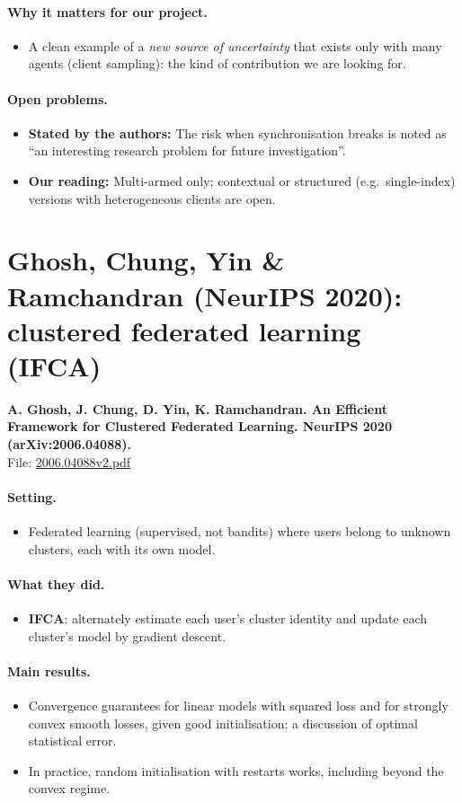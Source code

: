 \documentclass[11pt]{article}
\newcommand{\stated}{\textcolor{green!40!black}{\textbf{Stated by the authors:}}}
\newcommand{\ours}{\textcolor{orange!80!black}{\textbf{Our reading:}}}
\newcommand{\file}[1]{\url{#1}}
\begin{document}
\paragraph{Why it matters for our project.}
\begin{itemize}\item A clean example of a \emph{new source of uncertainty} that exists only with many agents (client sampling): the kind of contribution we are looking for.\end{itemize}
\paragraph{Open problems.}
\begin{itemize}\item \stated{} The risk when synchronisation breaks is noted as ``an interesting research problem for future investigation''.\item \ours{} Multi-armed only; contextual or structured (e.g.\ single-index) versions with heterogeneous clients are open.\end{itemize}
\section{Ghosh, Chung, Yin \& Ramchandran (NeurIPS 2020): clustered federated learning (IFCA)}
\textbf{A. Ghosh, J. Chung, D. Yin, K. Ramchandran. An Efficient Framework for Clustered Federated Learning. NeurIPS 2020 (arXiv:2006.04088).}\\ File: \file{2006.04088v2.pdf}
\paragraph{Setting.}
\begin{itemize}\item Federated learning (supervised, not bandits) where users belong to unknown clusters, each with its own model.\end{itemize}
\paragraph{What they did.}
\begin{itemize}\item \textbf{IFCA}: alternately estimate each user's cluster identity and update each cluster's model by gradient descent.\end{itemize}
\paragraph{Main results.}
\begin{itemize}\item Convergence guarantees for linear models with squared loss and for strongly convex smooth losses, given good initialisation; a discussion of optimal statistical error.\item In practice, random initialisation with restarts works, including beyond the convex regime.\end{itemize}
\end{document}

